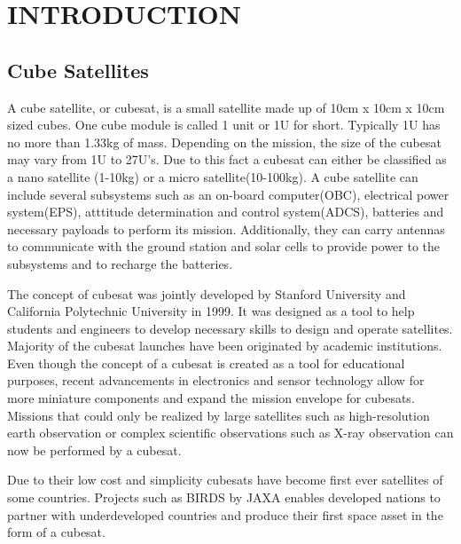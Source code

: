 \chapter{INTRODUCTION}\label{Ch1}
\section{Cube Satellites}

A cube satellite, or cubesat, is a small  satellite made up of 10cm x 10cm x 10cm sized cubes\cite{cubesatspec}. One cube module is called 1 unit or 1U for short. Typically 1U has no more than 1.33kg of mass\cite{cubesatspec}\cite{herrera2016cubesat}. Depending on the mission, the size of the cubesat may vary from 1U to 27U's. Due to this fact a cubesat can either be classified as a nano satellite (1-10kg) or a micro satellite(10-100kg)\cite{konecny2004small}. A cube satellite can include several subsystems such as an on-board computer(OBC), electrical power system(EPS), atttitude determination and control system(ADCS), batteries and necessary payloads to perform its mission. Additionally, they can carry antennas to communicate with the ground station and solar cells to provide power to the subsystems and to recharge the batteries. 

The concept of cubesat was jointly developed by Stanford University and California Polytechnic University in 1999. It was designed as a tool to help students and engineers to develop necessary skills to design and operate satellites.  Majority of the cubesat launches have been originated by academic institutions. Even though the concept of a cubesat is created as a tool for educational purposes, recent advancements in electronics and sensor technology allow for more miniature components and expand the mission envelope for cubesats. Missions that could only be realized by large satellites such as high-resolution earth observation or complex scientific observations such as X-ray observation can now be performed by a cubesat. 

Due to their low cost and simplicity cubesats have become first ever satellites of some countries. Projects such as BIRDS by JAXA enables developed nations to partner with underdeveloped countries and produce their first space asset in the form of a cubesat\cite{pradhan2018birds}. 

